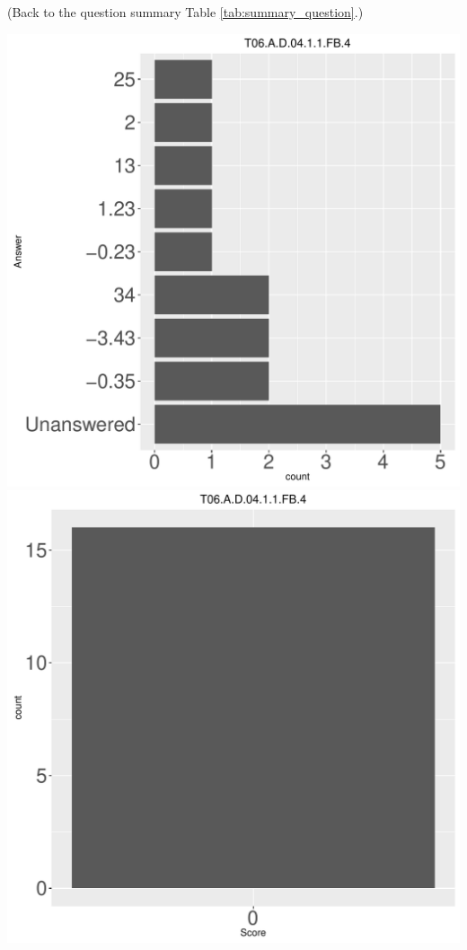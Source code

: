 \documentclass[12pt,english,nohyper]{tufte-handout}\usepackage[]{graphicx}\usepackage[]{color}
\begin{document}
 (Back to the question summary Table \ref{tab:summary_question}.)

\begin{center} \includegraphics[width=.45\linewidth]{Topic06_AB_16_answer} \includegraphics[width=.45\linewidth]{Topic06_AB_16_score} \end{center} 
\end{document}
